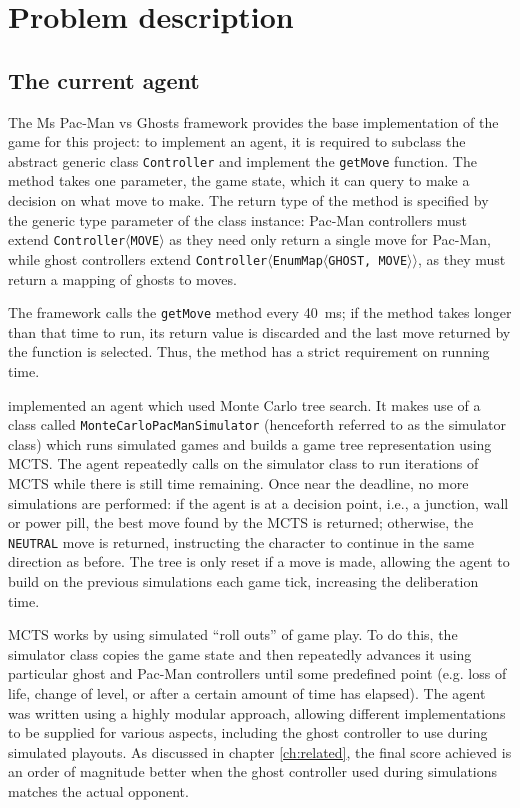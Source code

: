\chapter{Problem description}
\label{ch:problem}

\section{The current agent}

The Ms Pac-Man vs Ghosts framework provides the base implementation of the game for this project: to implement an agent, it is required to subclass the abstract generic class {\tt Controller} and implement the {\tt getMove} function.  The method takes one parameter, the game state, which it can query to make a decision on what move to make.  The return type of the method is specified by the generic type parameter of the class instance:  Pac-Man controllers must extend {\tt Controller{$\langle$}MOVE{$\rangle$}} as they need only return a single move for Pac-Man, while ghost controllers extend {\tt Controller{$\langle$}EnumMap{$\langle$}GHOST, MOVE{$\rangle\rangle$}}, as they must return a mapping of ghosts to moves.

The framework calls the {\tt getMove} method every 40~ms; if the method takes longer than that time to run, its return value is discarded and the last move returned by the function is selected.  Thus, the method has a strict requirement on running time.

\citet{Me2012} implemented an agent which used Monte Carlo tree search.  It makes use of a class called {\tt MonteCarloPacManSimulator} (henceforth referred to as the simulator class) which runs simulated games and builds a game tree representation using MCTS.  The agent repeatedly calls on the simulator class to run iterations of MCTS while there is still time remaining.  Once near the deadline, no more simulations are performed: if the agent is at a decision point, i.e., a junction, wall or power pill, the best move found by the MCTS is returned; otherwise, the {\tt NEUTRAL} move is returned, instructing the character to continue in the same direction as before.  The tree is only reset if a move is made, allowing the agent to build on the previous simulations each game tick, increasing the deliberation time.

MCTS works by using simulated ``roll outs'' of game play.  To do this, the simulator class copies the game state and then repeatedly advances it using particular ghost and Pac-Man controllers until some predefined point (e.g. loss of life, change of level, or after a certain amount of time has elapsed).  The agent was written using a highly modular approach, allowing different implementations to be supplied for various aspects, including the ghost controller to use during simulated playouts.  As discussed in chapter \ref{ch:related}, the final score achieved is an order of magnitude better when the ghost controller used during simulations matches the actual opponent.

